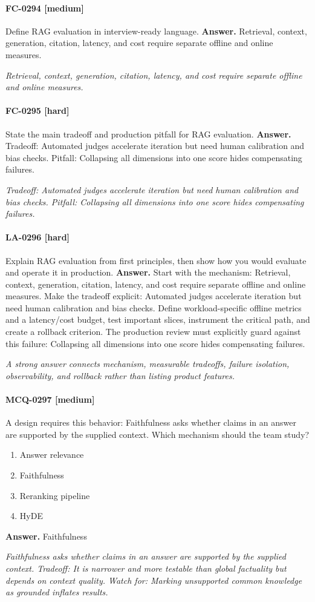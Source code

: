 \paragraph{FC-0294 [medium]} Define RAG evaluation in interview-ready language.
\noindent\textbf{Answer.} Retrieval, context, generation, citation, latency, and cost require separate offline and online measures.
\par\textit{Retrieval, context, generation, citation, latency, and cost require separate offline and online measures.}
\paragraph{FC-0295 [hard]} State the main tradeoff and production pitfall for RAG evaluation.
\noindent\textbf{Answer.} Tradeoff: Automated judges accelerate iteration but need human calibration and bias checks. Pitfall: Collapsing all dimensions into one score hides compensating failures.
\par\textit{Tradeoff: Automated judges accelerate iteration but need human calibration and bias checks. Pitfall: Collapsing all dimensions into one score hides compensating failures.}
\paragraph{LA-0296 [hard]} Explain RAG evaluation from first principles, then show how you would evaluate and operate it in production.
\noindent\textbf{Answer.} Start with the mechanism: Retrieval, context, generation, citation, latency, and cost require separate offline and online measures. Make the tradeoff explicit: Automated judges accelerate iteration but need human calibration and bias checks. Define workload-specific offline metrics and a latency/cost budget, test important slices, instrument the critical path, and create a rollback criterion. The production review must explicitly guard against this failure: Collapsing all dimensions into one score hides compensating failures.
\par\textit{A strong answer connects mechanism, measurable tradeoffs, failure isolation, observability, and rollback rather than listing product features.}
\paragraph{MCQ-0297 [medium]} A design requires this behavior: Faithfulness asks whether claims in an answer are supported by the supplied context. Which mechanism should the team study?
\begin{enumerate}[label=\Alph*.]
\item Answer relevance
\item Faithfulness
\item Reranking pipeline
\item HyDE
\end{enumerate}
\noindent\textbf{Answer.} Faithfulness
\par\textit{Faithfulness asks whether claims in an answer are supported by the supplied context. Tradeoff: It is narrower and more testable than global factuality but depends on context quality. Watch for: Marking unsupported common knowledge as grounded inflates results.}
